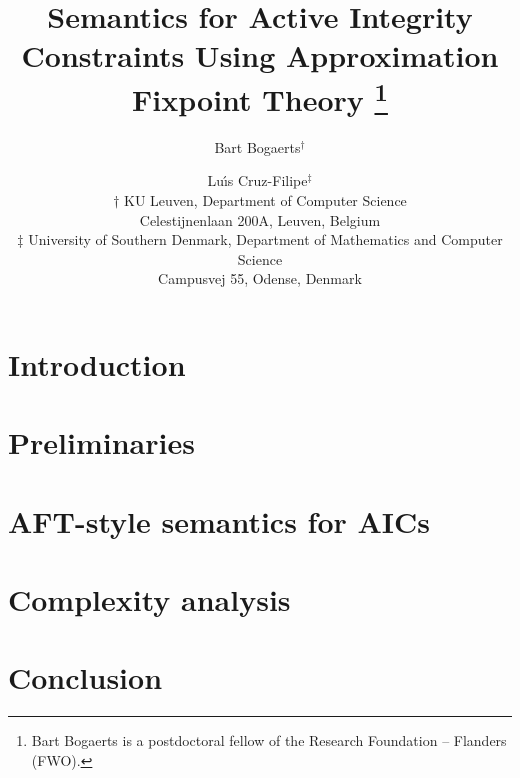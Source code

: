 \documentclass{article}
\title{Semantics for Active Integrity Constraints Using Approximation Fixpoint Theory%
\thanks{Bart Bogaerts is a postdoctoral fellow of the Research Foundation -- Flanders (FWO).}
}
\author{
Bart Bogaerts$^\dagger$ \and Lu\'\i s Cruz-Filipe$^\ddagger$  \\
$\dagger$ KU Leuven, Department of Computer Science\\ Celestijnenlaan 200A, Leuven, Belgium \\
$\ddagger$ University of Southern Denmark, Department of Mathematics and Computer Science\\
Campusvej 55, Odense, Denmark}
\begin{document}
\maketitle




\section{Introduction}


\section{Preliminaries}


\section{AFT-style semantics for AICs}




\section{Complexity analysis}



\section{Conclusion}


\newpage \small



\end{document}
